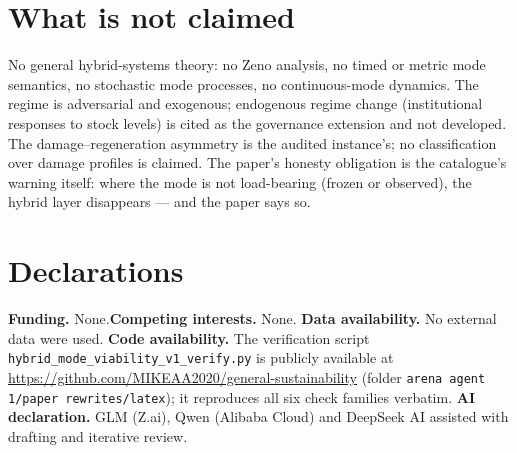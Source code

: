 \documentclass[10pt,twocolumn]{article}
\theoremstyle{definition}
\begin{document}
\section{What is not claimed}

No general hybrid-systems theory: no Zeno analysis, no timed or metric
mode semantics, no stochastic mode processes, no continuous-mode dynamics.
The regime is adversarial and exogenous; endogenous regime change
(institutional responses to stock levels) is cited as the governance
extension and not developed. The damage--regeneration asymmetry is the
audited instance's; no classification over damage profiles is claimed.
The paper's honesty obligation is the catalogue's warning itself: where
the mode is not load-bearing (frozen or observed), the hybrid layer
disappears --- and the paper says so.


\section*{Declarations}
\textbf{Funding.} None.\quad \textbf{Competing interests.} None.\quad
\textbf{Data availability.} No external data were used.\quad
\textbf{Code availability.} The verification script
\texttt{hybrid\_mode\_viability\_v1\_verify.py} is publicly available at
\url{https://github.com/MIKEAA2020/general-sustainability} (folder
\texttt{arena agent 1/paper rewrites/latex}); it reproduces all six check
families verbatim.\quad
\textbf{AI declaration.} GLM (Z.ai), Qwen (Alibaba Cloud) and DeepSeek AI
assisted with drafting and iterative review.
\end{document}
